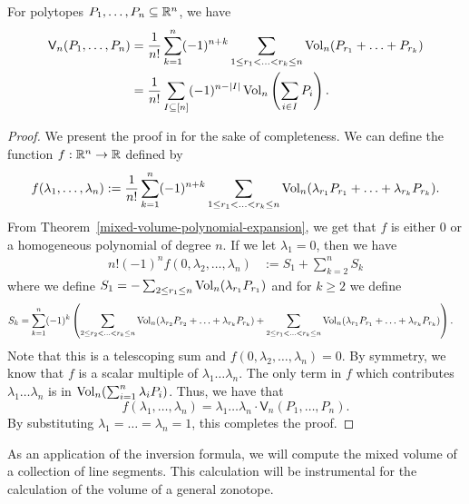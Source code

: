 \documentclass{puthesis-UG}
\begin{document}
\begin{thm} \label{inversion-formula}
	For polytopes $P_1, \ldots, P_n \subseteq \mathbb{R}^n$, we have
	\begin{align*}
		\mathsf{V}_n(P_1, \ldots, P_n) & = \frac{1}{n!} \sum_{k = 1}^n (-1)^{n+k} \sum_{1 \leq r_1 < \ldots < r_k \leq n} \operatorname{Vol}_n (P_{r_1} + \ldots + P_{r_k}) \\
		& = \frac{1}{n!} \sum_{I \subseteq [n]} (-1)^{n - |I|} \operatorname{Vol}_n \left ( \sum_{i \in I} P_i \right ).
	\end{align*}
\end{thm}

\begin{proof}
	We present the proof in \cite{schneider_2013} for the sake of completeness. We can define the function $f : \mathbb{R}^n \to \mathbb{R}$ defined by 
	\[
		f(\lambda_1, \ldots, \lambda_n) := \frac{1}{n!} \sum_{k = 1}^n (-1)^{n+k} \sum_{1 \leq r_1 < \ldots < r_k \leq n} \operatorname{Vol}_n(\lambda_{r_1} P_{r_1} + \ldots+ \lambda_{r_k} P_{r_k}).
	\]
	From Theorem~\ref{mixed-volume-polynomial-expansion}, we get that $f$ is either $0$ or a homogeneous polynomial of degree $n$. If we let $\lambda_1 = 0$, then we have
	\begin{align*}
		n! (-1)^n f(0, \lambda_2, \ldots, \lambda_n) & := S_1 + \sum_{k = 2}^n S_k
	\end{align*}
	where we define $S_1 = - \sum_{2 \leq r_1 \leq n} \operatorname{Vol}_n (\lambda_{r_1} P_{r_1})$ and for $k \geq 2$ we define
	\begin{align*}
		S_k & = \sum_{k = 1}^n (-1)^k \left ( \sum_{2 \leq r_2 < \ldots < r_k \leq n} \operatorname{Vol}_n(\lambda_{r_2} P_{r_2} + \ldots + \lambda_{r_k} P_{r_k}) + \sum_{2 \leq r_1 < \ldots < r_k \leq n} \operatorname{Vol}_n (\lambda_{r_1} P_{r_1} + \ldots + \lambda_{r_k} P_{r_k})\right ).
	\end{align*}
	Note that this is a telescoping sum and $f(0, \lambda_2, \ldots, \lambda_n) = 0$. By symmetry, we know that $f$ is a scalar multiple of $\lambda_1 \ldots \lambda_n$. The only term in $f$ which contributes $\lambda_1 \ldots \lambda_n$ is in $\operatorname{Vol}_n (\sum_{i = 1}^n \lambda_i P_i)$. Thus, we have that 
	\[
		f(\lambda_1, \ldots, \lambda_n) = \lambda_1 \ldots \lambda_n \cdot \mathsf{V}_n (P_1, \ldots, P_n).
	\]
	By substituting $\lambda_1 = \ldots = \lambda_n = 1$, this completes the proof. 
\end{proof}

As an application of the inversion formula, we will compute the mixed volume of a collection of line segments. This calculation will be instrumental for the calculation of the volume of a general zonotope. 
\end{document}
